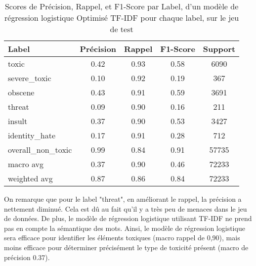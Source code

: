 \begin{table}[ht]
    \centering
    \caption{Scores de Précision, Rappel, et F1-Score par Label, d'un modèle de régression logistique Optimisé TF-IDF pour chaque label, sur le jeu de test}    \begin{tabular}{lcccc}
    \hline
    \textbf{Label} & \textbf{Précision} & \textbf{Rappel} & \textbf{F1-Score} & \textbf{Support} \\ \hline
    toxic          & 0.42               & 0.93            & 0.58              & 6090             \\
    severe\_toxic  & 0.10               & 0.92            & 0.19              & 367              \\
    obscene        & 0.43               & 0.91            & 0.59              & 3691             \\
    threat         & 0.09               & 0.90            & 0.16              & 211              \\
    insult         & 0.37               & 0.90            & 0.53              & 3427             \\
    identity\_hate & 0.17               & 0.91            & 0.28              & 712              \\
    overall\_non\_toxic & 0.99           & 0.84            & 0.91              & 57735            \\\hline
    macro avg      & 0.37               & 0.90            & 0.46              & 72233            \\
    weighted avg   & 0.87               & 0.86            & 0.84              & 72233            \\
    \end{tabular}
    \label{tab:scores}
\end{table}

On remarque que pour le label "threat", en améliorant le rappel, la précision a nettement diminué. 
Cela est dû au fait qu'il y a très peu de menaces dans le jeu de données. 
De plus, le modèle de régression logistique utilisant TF-IDF ne prend pas en compte la sémantique des mots. 
Ainsi, le modèle de régression logistique sera efficace pour identifier les éléments toxiques (macro rappel de 0,90), mais moins efficace pour déterminer précisément le type de toxicité présent (macro de précision 0.37).


